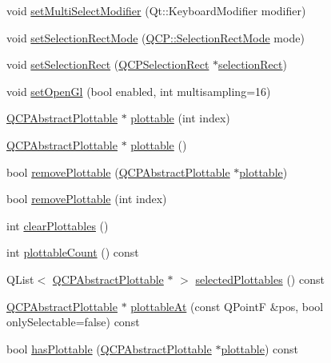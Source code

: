 \begin{DoxyCompactItemize}
\item 
void \hyperlink{classQCustomPlot_a8fc96e3b5138a06759a2a90c166df516}{set\+Multi\+Select\+Modifier} (Qt\+::\+Keyboard\+Modifier modifier)
\item 
void \hyperlink{classQCustomPlot_a810ef958ebe84db661c7288b526c0deb}{set\+Selection\+Rect\+Mode} (\hyperlink{namespaceQCP_ac9aa4d6d81ac76b094f9af9ad2d3aacf}{Q\+C\+P\+::\+Selection\+Rect\+Mode} mode)
\item 
void \hyperlink{classQCustomPlot_a0c09f96df15faa4799ad7051bb16cf33}{set\+Selection\+Rect} (\hyperlink{classQCPSelectionRect}{Q\+C\+P\+Selection\+Rect} $\ast$\hyperlink{classQCustomPlot_ad7df2bcbba307e644db383b449e31efd}{selection\+Rect})
\item 
void \hyperlink{classQCustomPlot_a7db1adc09016329f3aef7c60da935789}{set\+Open\+Gl} (bool enabled, int multisampling=16)
\item 
\hyperlink{classQCPAbstractPlottable}{Q\+C\+P\+Abstract\+Plottable} $\ast$ \hyperlink{classQCustomPlot_a32de81ff53e263e785b83b52ecd99d6f}{plottable} (int index)
\item 
\hyperlink{classQCPAbstractPlottable}{Q\+C\+P\+Abstract\+Plottable} $\ast$ \hyperlink{classQCustomPlot_adea38bdc660da9412ba69fb939031567}{plottable} ()
\item 
bool \hyperlink{classQCustomPlot_af3dafd56884208474f311d6226513ab2}{remove\+Plottable} (\hyperlink{classQCPAbstractPlottable}{Q\+C\+P\+Abstract\+Plottable} $\ast$\hyperlink{classQCustomPlot_a32de81ff53e263e785b83b52ecd99d6f}{plottable})
\item 
bool \hyperlink{classQCustomPlot_afc210e0021480f8119bccf37839dbcc8}{remove\+Plottable} (int index)
\item 
int \hyperlink{classQCustomPlot_a9a409bb3201878adb7ffba1c89c4e004}{clear\+Plottables} ()
\item 
int \hyperlink{classQCustomPlot_a5f4f15991c14bf9ad659bb2a19dfbed4}{plottable\+Count} () const
\item 
Q\+List$<$ \hyperlink{classQCPAbstractPlottable}{Q\+C\+P\+Abstract\+Plottable} $\ast$ $>$ \hyperlink{classQCustomPlot_a747faaab57c56891e901a1e97fa4359a}{selected\+Plottables} () const
\item 
\hyperlink{classQCPAbstractPlottable}{Q\+C\+P\+Abstract\+Plottable} $\ast$ \hyperlink{classQCustomPlot_acddbbd8b16dd633f0d94e5a736fbd8cf}{plottable\+At} (const Q\+PointF \&pos, bool only\+Selectable=false) const
\item 
bool \hyperlink{classQCustomPlot_a72cefbfbb9e699940e37be605bd9c51e}{has\+Plottable} (\hyperlink{classQCPAbstractPlottable}{Q\+C\+P\+Abstract\+Plottable} $\ast$\hyperlink{classQCustomPlot_a32de81ff53e263e785b83b52ecd99d6f}{plottable}) const

\end{DoxyCompactItemize}
